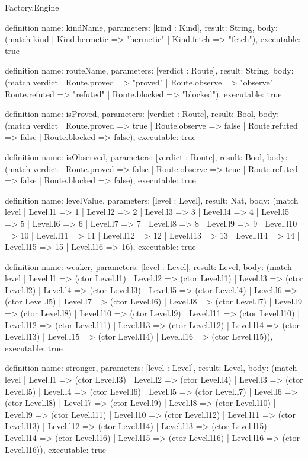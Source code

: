 \begin{lexlean}{Factory.Engine}
\begin{semanticmodule}
definition{
  name: kindName,
  parameters: [kind : Kind],
  result: String,
  body: (match kind
    | Kind.hermetic => "hermetic"
    | Kind.fetch => "fetch"),
  executable: true
}

definition{
  name: routeName,
  parameters: [verdict : Route],
  result: String,
  body: (match verdict
    | Route.proved => "proved"
    | Route.observe => "observe"
    | Route.refuted => "refuted"
    | Route.blocked => "blocked"),
  executable: true
}

definition{
  name: isProved,
  parameters: [verdict : Route],
  result: Bool,
  body: (match verdict
    | Route.proved => true
    | Route.observe => false
    | Route.refuted => false
    | Route.blocked => false),
  executable: true
}

definition{
  name: isObserved,
  parameters: [verdict : Route],
  result: Bool,
  body: (match verdict
    | Route.proved => false
    | Route.observe => true
    | Route.refuted => false
    | Route.blocked => false),
  executable: true
}

definition{
  name: levelValue,
  parameters: [level : Level],
  result: Nat,
  body: (match level
    | Level.l1 => 1
    | Level.l2 => 2
    | Level.l3 => 3
    | Level.l4 => 4
    | Level.l5 => 5
    | Level.l6 => 6
    | Level.l7 => 7
    | Level.l8 => 8
    | Level.l9 => 9
    | Level.l10 => 10
    | Level.l11 => 11
    | Level.l12 => 12
    | Level.l13 => 13
    | Level.l14 => 14
    | Level.l15 => 15
    | Level.l16 => 16),
  executable: true
}

definition{
  name: weaker,
  parameters: [level : Level],
  result: Level,
  body: (match level
    | Level.l1 => (ctor Level.l1)
    | Level.l2 => (ctor Level.l1)
    | Level.l3 => (ctor Level.l2)
    | Level.l4 => (ctor Level.l3)
    | Level.l5 => (ctor Level.l4)
    | Level.l6 => (ctor Level.l5)
    | Level.l7 => (ctor Level.l6)
    | Level.l8 => (ctor Level.l7)
    | Level.l9 => (ctor Level.l8)
    | Level.l10 => (ctor Level.l9)
    | Level.l11 => (ctor Level.l10)
    | Level.l12 => (ctor Level.l11)
    | Level.l13 => (ctor Level.l12)
    | Level.l14 => (ctor Level.l13)
    | Level.l15 => (ctor Level.l14)
    | Level.l16 => (ctor Level.l15)),
  executable: true
}

definition{
  name: stronger,
  parameters: [level : Level],
  result: Level,
  body: (match level
    | Level.l1 => (ctor Level.l3)
    | Level.l2 => (ctor Level.l4)
    | Level.l3 => (ctor Level.l5)
    | Level.l4 => (ctor Level.l6)
    | Level.l5 => (ctor Level.l7)
    | Level.l6 => (ctor Level.l8)
    | Level.l7 => (ctor Level.l9)
    | Level.l8 => (ctor Level.l10)
    | Level.l9 => (ctor Level.l11)
    | Level.l10 => (ctor Level.l12)
    | Level.l11 => (ctor Level.l13)
    | Level.l12 => (ctor Level.l14)
    | Level.l13 => (ctor Level.l15)
    | Level.l14 => (ctor Level.l16)
    | Level.l15 => (ctor Level.l16)
    | Level.l16 => (ctor Level.l16)),
  executable: true
}


\end{semanticmodule}
\end{lexlean}

